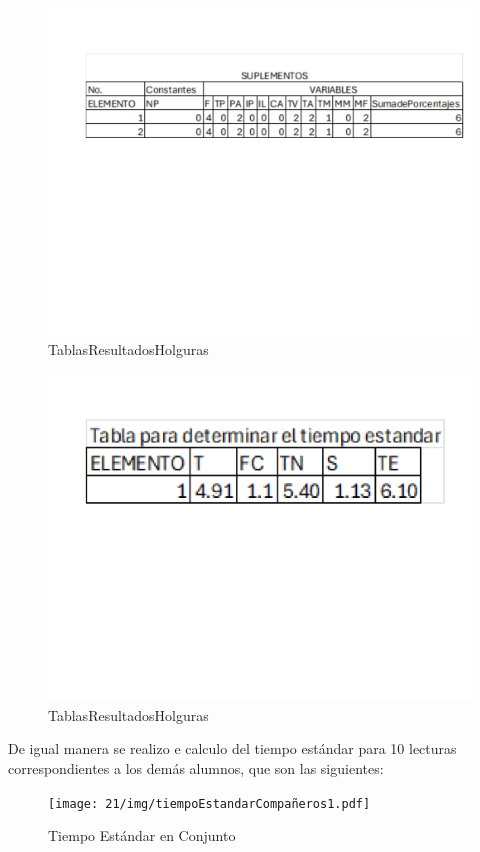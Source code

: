     \begin{figure}[H]
        \centering
        \includegraphics[scale=0.300]{21/img/suplementosResultados.pdf}
        \caption{TablasResultadosHolguras}
        \label{fig:suplementosResultados}
    \end{figure}
    
    \begin{figure}[H]
        \centering
        \includegraphics[scale=0.300]{21/img/suplementosResultados2.pdf}
        \caption{TablasResultadosHolguras}
        \label{fig:suplementosResultados2}
    \end{figure}
    
    De igual manera se realizo e calculo del tiempo estándar para 10 lecturas correspondientes a los demás alumnos, que son las siguientes: 
    \begin{figure}[H]
        \centering
        \texttt{[image: 21/img/tiempoEstandarCompañeros1.pdf]}
        \caption{Tiempo Estándar en Conjunto}
        \label{fig:tiempoEstandarCompañeros1}
    \end{figure}
    
